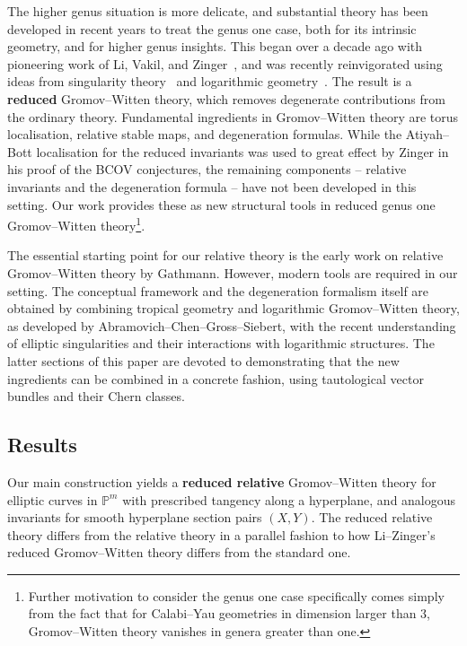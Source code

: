 \documentclass[11pt]{amsart}
\theoremstyle{definition}
\theoremstyle{definition}
\begin{document}
The higher genus situation is more delicate, and substantial theory has been developed in recent years to treat the genus one case, both for its intrinsic geometry, and for higher genus insights. This began over a decade ago with pioneering work of Li, Vakil, and Zinger~\cite{redgone,VZ,LZ,lz2,zingerstvsred,zingred}, and was recently reinvigorated using ideas from singularity theory~\cite{BCM18,HL,SMY1,VISC} and logarithmic geometry~\cite{RSPW,RSPW2,BC20}. The result is a \textbf{reduced} Gromov--Witten theory, which removes degenerate contributions from the ordinary theory. Fundamental ingredients in Gromov--Witten theory are torus localisation, relative stable maps, and degeneration formulas. While the Atiyah--Bott localisation for the reduced invariants was used to great effect by Zinger in his proof of the BCOV conjectures, the remaining components -- relative invariants and the degeneration formula -- have not been developed in this setting. Our work provides these as new {structural} tools in reduced genus one Gromov--Witten theory\footnote{Further motivation to consider the genus one case specifically comes simply from the fact that for Calabi--Yau geometries in dimension larger than $3$, Gromov--Witten theory vanishes in genera greater than one.}. 

The essential starting point for our relative theory is the early work on relative Gromov--Witten theory by Gathmann. However, modern tools are required in our setting. The conceptual framework and the degeneration formalism itself are obtained by combining tropical geometry and logarithmic Gromov--Witten theory, as developed by Abramovich--Chen--Gross--Siebert, with the recent understanding of elliptic singularities and their interactions with logarithmic structures. The latter sections of this paper are devoted to demonstrating that the new ingredients can be combined in a concrete fashion, using tautological vector bundles and their Chern classes. 


\subsection{Results} Our main construction yields a \textbf{reduced relative} Gromov--Witten theory for elliptic curves in $\mathbb P^m$ with prescribed tangency along a hyperplane, and analogous invariants for smooth hyperplane section pairs $(X,Y)$. The reduced relative theory differs from the relative theory in a parallel fashion to how Li--Zinger's reduced Gromov--Witten theory differs from the standard one. 
\end{document}
